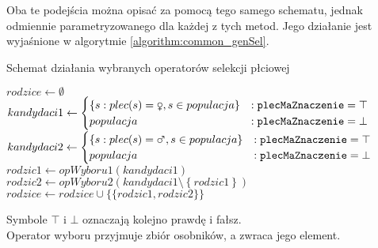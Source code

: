 \documentclass[./FM_mgr.tex]{subfiles}
\begin{document}
Oba te podejścia można opisać za pomocą tego samego schematu, jednak odmiennie parametryzowanego dla każdej z tych metod. Jego działanie jest wyjaśnione w algorytmie \ref{algorithm:common_genSel}.

\begin{algorithm}
	\caption{Schemat działania wybranych operatorów selekcji płciowej \label{algorithm:common_genSel} }
	\begin{algorithmic}[1]
		\Start
		\Var $rodzice \gets \emptyset$
		\label{line:stdGenSelChoose_init_parent}
		\Var $kandydaci1 \gets \begin{cases} 
		\left\{ s: plec(s)=\female, s \in populacja \right\} &: \param{plecMaZnaczenie}=\top\\ 
		populacja &: \param{plecMaZnaczenie}=\bot
		\end{cases} $
		\label{line:stdGenSelChoose_init_candidates_begin}
		\Var $kandydaci2 \gets \begin{cases} 
		\left\{ s: plec(s)=\male, s \in populacja \right\} &: \param{plecMaZnaczenie}=\top\\ 
		populacja &: \param{plecMaZnaczenie}=\bot
		\end{cases} $
		\label{line:stdGenSelChoose_init_candidates_end}
		\label{line:stdGenSelChoose_while}
		\Var $rodzic1 \gets opWyboru1(kandydaci1) $
		\label{line:stdGenSelChoose_choose_begin}
		\Var $rodzic2 \gets opWyboru2(kandydaci1 \setminus \left\{ rodzic1 \right\}) $
		\label{line:stdGenSelChoose_choose_end}
		\State $rodzice \gets rodzice \cup \{  \{ rodzic1, rodzic2 \} \}$
		\label{line:stdGenSelChoose_parents_merge}
		\EndWhile
		\State {}
		\label{line:stdGenSelChoose_return}
		\EndOperator
	\end{algorithmic}
	Symbole $\top$ i $\bot$ oznaczają kolejno prawdę i fałsz.\\
	Operator wyboru przyjmuje zbiór osobników, a zwraca jego element.
\end{algorithm}
\end{document}
